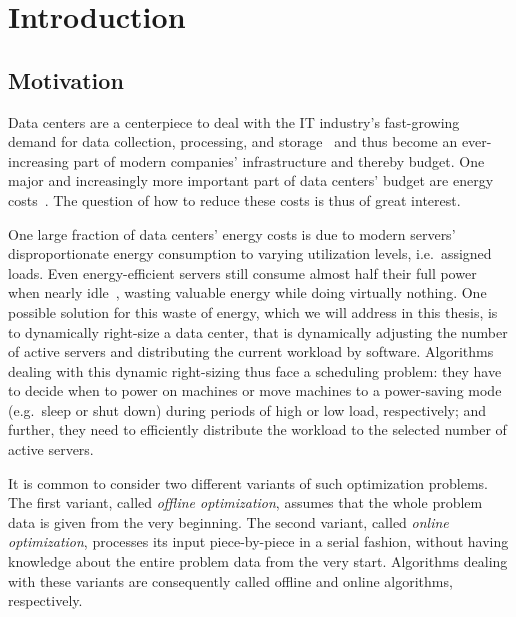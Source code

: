 
\chapter{Introduction}
\section{Motivation}
Data centers are a centerpiece to deal with the IT industry's fast-growing demand for data collection, processing, and storage~\parencite{cisco} and thus become an ever-increasing part of modern companies' infrastructure and thereby budget. One major and increasingly more important part of data centers' budget are energy costs~\parencite{hamilton}. The question of how to reduce these costs is thus of great interest.

One large fraction of data centers' energy costs is due to modern servers' disproportionate energy consumption to varying utilization levels, i.e.\ assigned loads. Even energy-efficient servers still consume almost half their full power when nearly idle~\parencite{barroso}, wasting valuable energy while doing virtually nothing. One possible solution for this waste of energy, which we will address in this thesis, is to dynamically right-size a data center, that is dynamically adjusting the number of active servers and distributing the current workload by software. Algorithms dealing with this dynamic right-sizing thus face a scheduling problem: they have to decide when to power on machines or move machines to a power-saving mode (e.g.~sleep or shut down) during periods of high or low load, respectively; and further, they need to efficiently distribute the workload to the selected number of active servers.

It is common to consider two different variants of such optimization problems. The first variant, called \emph{offline optimization}, assumes that the whole problem data is given from the very beginning. The second variant, called \emph{online optimization}, processes its input piece-by-piece in a serial fashion, without having knowledge about the entire problem data from the very start. Algorithms dealing with these variants are consequently called offline and online algorithms, respectively.

